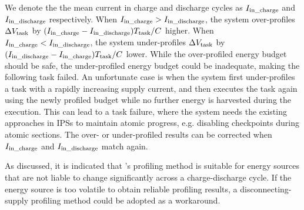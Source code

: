 We denote the the mean current in charge and discharge cycles as $I_{\text{in\_charge}}$ and $I_{\text{in\_discharge}}$ respectively. 
When $I_{\text{in\_charge}} > I_{\text{in\_discharge}}$, the system over-profiles $\Delta V_{\text{task}}$ by $(I_{\text{in\_charge}} - I_{\text{in\_discharge}}) T_{\text{task}} / C$ higher. 
When $I_{\text{in\_charge}} < I_{\text{in\_discharge}}$, the system under-profiles $\Delta V_{\text{task}}$ by $(I_{\text{in\_discharge}} - I_{\text{in\_charge}}) T_{\text{task}} / C$ lower. 
While the over-profiled energy budget should be safe, the under-profiled energy budget could be inadequate, making the following task failed. 
An unfortunate case is when the system first under-profiles a task with a rapidly increasing supply current, and then executes the task again using the newly profiled budget while no further energy is harvested during the execution. 
This can lead to a task failure, where the system needs the existing approaches in IPSs to maintain atomic progress, e.g. disabling checkpoints during atomic sections.
The over- or under-profiled results can be corrected when $I_{\text{in\_charge}}$ and $I_{\text{in\_discharge}}$ match again.

As discussed, it is indicated that \nn{}'s profiling method is suitable for energy sources that are not liable to change significantly across a charge-discharge cycle. 
If the energy source is too volatile to obtain reliable profiling results, a disconnecting-supply profiling method could be adopted as a workaround. 



